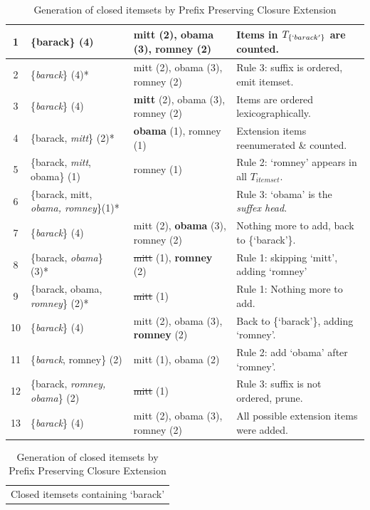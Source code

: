 \documentclass{sig-alternate}
\begin{document}
\begin{table}
\begin{tabular}{|c|p{5cm}|p{5cm}|p{5.5cm}|}
1& \{barack\} (4) & mitt (2), obama (3), romney (2) & {\small Items in $T_{\{`barack'\}}$ are counted. }\\\hline 
2& \{\emph{barack}\} (4)* & mitt (2), obama (3), romney (2) &  {\small Rule 3: suffix is ordered, emit itemset.  } \\ \hline
3& \{\emph{barack}\} (4) & \textbf{mitt} (2), obama (3), romney (2) &  {\small Items are ordered lexicographically.} \\ \hline
4& \{barack, \emph{mitt}\} (2)* & \textbf{obama} (1), romney (1) &  {\small Extension items reenumerated \& counted.}\\\hline
5 & \{barack, \emph{mitt}, obama\} (1) & romney (1)                       &  {\small Rule 2: `romney' appears in all $T_{itemset}$. } \\\hline
6 & \{barack, mitt, \emph{obama, romney}\}(1)* & & {\small Rule 3: `obama'  is the \emph{suffex head}. } \\\hline
7 & \{\emph{barack}\} (4) & mitt (2), \textbf{obama} (3), romney (2) &  {\small Nothing more to add, back to \{`barack'\}.}\\\hline
8 & \{barack, \emph{obama}\} (3)* & \sout{mitt} (1), \textbf{romney} (2) &  {\small Rule 1: skipping `mitt', adding `romney'  } \\\hline
9 & \{barack, obama, \emph{romney}\} (2)* & \sout{mitt} (1) &  {\small Rule 1: Nothing more to add.  } \\\hline
10 & \{\emph{barack}\} (4) & mitt (2), obama (3), \textbf{romney} (2) &  {\small Back to \{`barack'\}, adding `romney'. } \\\hline
11 & \{\emph{barack}, romney\} (2) &  mitt (1), obama (2) &  {\small Rule 2: add `obama' after `romney'. } \\\hline
12 & \{barack, \emph{romney, obama}\} (2) &  \sout{mitt} (1)  &  {\small Rule 3: suffix is not ordered, prune.} \\\hline
13 & \{\emph{barack}\} (4) & mitt (2), obama (3), romney (2) &  {\small All possible extension items were added. } \\\hline
\end{tabular}
\begin{tabular}{c}
Closed itemsets containing `barack'
\end{tabular}
\caption{Generation of closed itemsets by Prefix Preserving Closure Extension}
\label{table:PPCExample}
\end{table}
\end{document}

